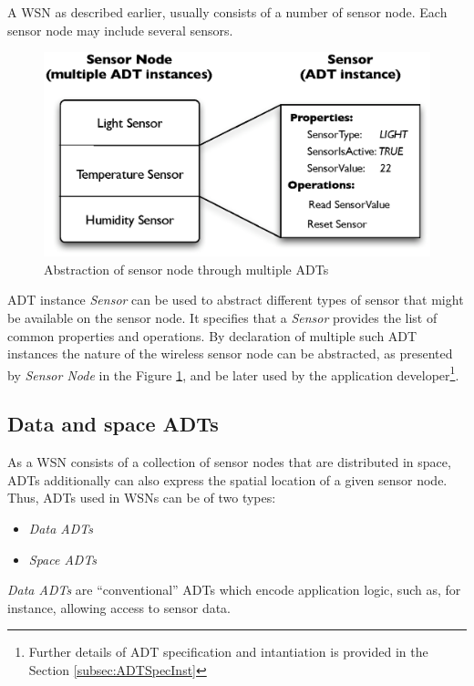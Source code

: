 A WSN as described earlier, usually consists of a number of sensor node. Each
sensor node may include several sensors.

\begin{figure}
\centering
\includegraphics[scale=0.71]{img/ADTsMultipleInstances.eps}
\caption[Abstraction of sensor node through multiple ADTs]{Abstraction of sensor node through multiple ADTs}
\label{Fig:MultipleADTs}
\end{figure} 
  
ADT instance \emph{Sensor} can be used to abstract different types of sensor
that might be available on the sensor node. It specifies that a \emph{Sensor}
provides the list of common properties and operations. 
By declaration of multiple such ADT instances the nature of the
wireless sensor node can be abstracted, as presented by \emph{Sensor Node} in
the Figure \ref{Fig:MultipleADTs}, and be later used by the application
developer\footnote{Further details of ADT specification and
intantiation is provided in the Section \ref{subsec:ADTSpecInst}}.

\subsection{Data and space ADTs} \label{subsubsec:DataAndSpaceADTs}

As a WSN consists of a collection of sensor nodes that are distributed in space,
ADTs additionally can also express the spatial location of a given sensor node.
Thus, ADTs used in WSNs can be of two types:

\begin{itemize}
  \item \emph{Data ADTs}
  \item \emph{Space ADTs} 
\end{itemize}

\emph{Data ADTs} are ``conventional'' ADTs which encode application logic, such
as, for instance, allowing access to sensor data.

